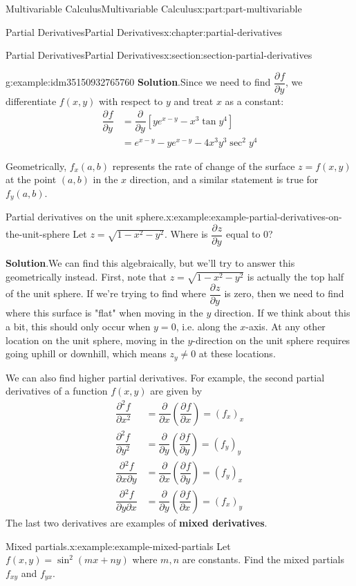 \documentclass[twoside,10pt,]{book}
\newcommand{\blocktitlefont}{\relax}
\newcommand{\terminology}[1]{\textbf{#1}}
\numberwithin{equation}{part}
\newcommand{\pdv}[3][]{\dfrac{\partial^{#1} #2}{\partial #3^{#1}}}
\begin{document}
\begin{partptx}{Multivariable Calculus}{}{Multivariable Calculus}{}{}{x:part:part-multivariable}
\begin{chapterptx}{Partial Derivatives}{}{Partial Derivatives}{}{}{x:chapter:partial-derivatives}
\begin{sectionptx}{Partial Derivatives}{}{Partial Derivatives}{}{}{x:section:section-partial-derivatives}
\begin{example}{}{g:example:idm35150932765760}
\noindent\textbf{\blocktitlefont Solution}.\hypertarget{g:solution:idm35150932764480}{}\quad{}Since we need to find \(\pdv{f}{y}\), we differentiate \(f(x,y)\) with respect to \(y\) and treat \(x\) as a constant:%
\begin{align*}
\pdv{f}{y} & = \pdv{}{y}\left[ye^{x-y} - x^{3}\tan y^{4}\right] \\
& = e^{x-y} - ye^{x-y} - 4x^{3}y^{3}\sec^{2}y^{4} 
\end{align*}
%
\end{example}
Geometrically, \(f_{x}(a,b)\) represents the rate of change of the surface \(z = f(x,y)\) at the point \((a,b)\) in the \(x\) direction, and a similar statement is true for \(f_{y}(a,b)\).%
\begin{example}{Partial derivatives on the unit sphere.}{x:example:example-partial-derivatives-on-the-unit-sphere}%
Let \(z = \sqrt{1-x^{2} - y^{2}}\). Where is \(\pdv{z}{y}\) equal to \(0\)?%
\par\smallskip%
\noindent\textbf{\blocktitlefont Solution}.\hypertarget{g:solution:idm35150932757440}{}\quad{}We can find this algebraically, but we'll try to answer this geometrically instead. First, note that \(z = \sqrt{1 - x^{2} - y^{2}}\) is actually the top half of the unit sphere. If we're trying to find where \(\pdv{z}{y}\) is zero, then we need to find where this surface is "flat" when moving in the \(y\) direction. If we think about this a bit, this should only occur when \(y=0\), i.e. along the \(x\)-axis. At any other location on the unit sphere, moving in the \(y\)-direction on the unit sphere requires going uphill or downhill, which means \(z_{y}\neq0\) at these locations.%
\end{example}
We can also find higher partial derivatives. For example, the second partial derivatives of a function \(f(x,y)\) are given by%
\begin{align*}
\pdv[2]{f}{x} & = \pdv{}{x}\left(\pdv{f}{x}\right) = (f_{x})_{x} \\
\pdv[2]{f}{y} & = \pdv{}{y}\left(\pdv{f}{y}\right) = (f_{y})_{y} \\
\pdv{{}^{2}f}{x\partial y} & = \pdv{}{x}\left(\pdv{f}{y}\right) = (f_{y})_{x} \\
\pdv{{}^{2}f}{y\partial x} & = \pdv{}{y}\left(\pdv{f}{x}\right) = (f_{x})_{y} 
\end{align*}
The last two derivatives are examples of \terminology{mixed derivatives}.%
\begin{example}{Mixed partials.}{x:example:example-mixed-partials}%
Let \(f(x,y) = \sin^{2}(mx+ny)\) where \(m,n\) are constants. Find the mixed partials \(f_{xy}\) and \(f_{yx}\).%

\end{example}
\end{sectionptx}
\end{chapterptx}
\end{partptx}
\end{document}
